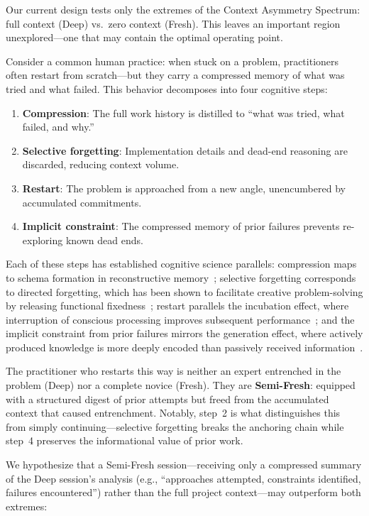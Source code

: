 \documentclass[11pt]{article}
\begin{document}
Our current design tests only the extremes of the Context Asymmetry Spectrum: full context (Deep) vs.\ zero context (Fresh). This leaves an important region unexplored---one that may contain the optimal operating point.

Consider a common human practice: when stuck on a problem, practitioners often restart from scratch---but they carry a compressed memory of what was tried and what failed. This behavior decomposes into four cognitive steps:

\begin{enumerate}[label=\arabic*., leftmargin=1.5em]
  \item \textbf{Compression}: The full work history is distilled to ``what was tried, what failed, and why.''
  \item \textbf{Selective forgetting}: Implementation details and dead-end reasoning are discarded, reducing context volume.
  \item \textbf{Restart}: The problem is approached from a new angle, unencumbered by accumulated commitments.
  \item \textbf{Implicit constraint}: The compressed memory of prior failures prevents re-exploring known dead ends.
\end{enumerate}

Each of these steps has established cognitive science parallels: compression maps to schema formation in reconstructive memory~\citep{bartlett1932remembering}; selective forgetting corresponds to directed forgetting, which has been shown to facilitate creative problem-solving by releasing functional fixedness~\citep{storm2012forgetting}; restart parallels the incubation effect, where interruption of conscious processing improves subsequent performance~\citep{sio2009incubation}; and the implicit constraint from prior failures mirrors the generation effect, where actively produced knowledge is more deeply encoded than passively received information~\citep{slamecka1978generation}.

The practitioner who restarts this way is neither an expert entrenched in the problem (Deep) nor a complete novice (Fresh). They are \textbf{Semi-Fresh}: equipped with a structured digest of prior attempts but freed from the accumulated context that caused entrenchment. Notably, step~2 is what distinguishes this from simply continuing---selective forgetting breaks the anchoring chain while step~4 preserves the informational value of prior work.

We hypothesize that a Semi-Fresh session---receiving only a compressed summary of the Deep session's analysis (e.g., ``approaches attempted, constraints identified, failures encountered'') rather than the full project context---may outperform both extremes:
\end{document}
